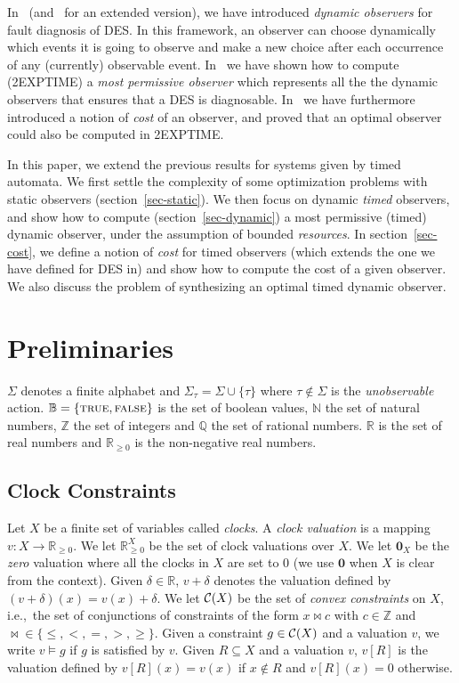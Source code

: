 \documentclass[letterpaper,10pt,conference]{ieeeconf}  \IEEEoverridecommandlockouts                              \overrideIEEEmargins
\def\ie{{i.e.},~}
\newcommand{\vect}[1]{\mathbf{#1}}
\newcommand{\setN}{\mathbb N}
\newcommand{\setR}{\mathbb R}
\newcommand{\setB}{\mathbb B}
\newcommand{\setZ}{\mathbb Z}
\newcommand{\setQ}{\mathbb Q}
\def\calC{{\cal C}}
\def\cc{\calC}
\def\tauac{\tau}
\def\true{\mbox{\textsc{true}}}
\def\false{\mbox{\textsc{false}}}
\begin{document}
In~\cite{cassez-acsd-07,cassez-tase-07} (and~\cite{cassez-fi-08} for
an extended version), we have introduced \emph{dynamic observers} for
fault diagnosis of DES.  In this framework, an observer can choose
dynamically which events it is going to observe and make a new choice
after each occurrence of any (currently) observable event.
In~\cite{cassez-acsd-07,cassez-fi-08} we have shown how to compute
(2EXPTIME) a \emph{most permissive observer} which represents all the
the dynamic observers that ensures that a DES is diagnosable.
In~\cite{cassez-tase-07} we have furthermore introduced a notion of
\emph{cost} of an observer, and proved that an optimal observer could
also be computed in 2EXPTIME.


In this paper, we extend the previous results for systems given by
timed automata. We first settle the complexity of some optimization
problems with static observers (section~\ref{sec-static}).  We then
focus on dynamic \emph{timed} observers, and show how to compute
(section~\ref{sec-dynamic}) a most permissive (timed) dynamic
observer, under the assumption of bounded \emph{resources}. In
section~\ref{sec-cost}, we define a notion of \emph{cost} for timed
observers (which extends the one we have defined for DES
in\cite{cassez-tase-07}) and show how to compute the cost of a given
observer.  We also discuss the problem of synthesizing an optimal
timed dynamic observer.




\section{Preliminaries}\label{sec-prelim}
$\Sigma$ denotes a finite alphabet and $\Sigma_\tauac=\Sigma \cup
\{\tauac\}$ where $\tauac \not\in \Sigma$ is the \emph{unobservable}
action.  $\setB=\{\true,\false\}$ is the set of boolean values,
$\setN$ the set of natural numbers, $\setZ$ the set of integers and
$\setQ$ the set of rational numbers.  $\setR$ is the set of real
numbers and $\setR_{\geq 0}$ is the non-negative real numbers.

\subsection{Clock Constraints}
Let $X$ be a finite set of variables called \emph{clocks}.  A
\emph{clock valuation} is a mapping $v : X \rightarrow \setR_{\geq
  0}$. We let $\setR_{\geq 0}^X$ be the set of clock valuations over
$X$. We let $\vect{0}_X$ be the \emph{zero} valuation where all the
clocks in $X$ are set to $0$ (we use $\vect{0}$ when $X$ is clear from
the context).  Given $\delta \in \setR$, $v + \delta$ denotes the
valuation defined by $(v + \delta)(x)=v(x) + \delta$. We let $\cc(X)$
be the set of \emph{convex constraints} on $X$, \ie the set of
conjunctions of constraints of the form $x \bowtie c$ with $c
\in\setZ$ and $\bowtie \in \{\leq,<,=,>,\geq\}$. Given a constraint $g
\in \cc(X)$ and a valuation $v$, we write $v \models g$ if $g$ is
satisfied by $v$.  Given $R \subseteq X$ and a valuation $v$, $v[R]$
is the valuation defined by $v[R](x)=v(x)$ if $x \not\in R$ and
$v[R](x)=0$ otherwise.
\end{document}
